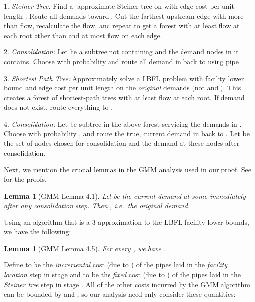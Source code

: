 \documentclass[11pt]{article}
\newtheorem{lem}[thm]{Lemma}
\begin{document}
\begin{description}

\item{1. \emph{Steiner Tree: }}
Find a -approximate Steiner tree on  with edge cost per unit length .  Route all demands toward .  Cut the farthest-upstream edge with more than  flow, recalculate the flow, and repeat to get a forest with at least  flow at each root other than  and at most  flow on each edge.

\item{2. \emph{Consolidation:}}
Let  be a subtree not containing  and  the demand nodes in  it contains.  Choose  with probability  and route all demand in  back to  using pipe .

\item{3. \emph{Shortest Path Tree:}}
Approximately solve a LBFL problem with facility lower bound  and edge cost per unit length  on the \emph{original} demands  (not  and ).  This creates a forest of shortest-path trees with at least  flow at each root.  If  demand does not exist, route everything to .

\item{4. \emph{Consolidation:}}
Let  be subtree in the above forest servicing the demands  in .  Choose  with probability , and route the true, current demand  in  back to .  Let  be the set of nodes chosen for consolidation and  the demand at these nodes after consolidation.
\end{description}

Next, we mention the crucial lemmas in the GMM analysis used in our proof.  See \cite{guha2001cfa} for the proofs.

\begin{lem}[GMM Lemma 4.1] \label{consolidation_lem} 
Let  be the current demand at some  immediately after any consolidation step.  Then , i.e.\ the original demand.
\end{lem}

Using an algorithm that is a 3-approximation to the LBFL facility lower bounds, we have the following:

\begin{lem}[GMM Lemma 4.5] \label{current_demand_lem}
For every , we have .
\end{lem}

Define  to be the \emph{incremental} cost (due to ) of the pipes laid in the \emph{facility location} step in stage  and  to be the \emph{fixed} cost (due to ) of the pipes laid in the \emph{Steiner tree} step in stage .  All of the other costs incurred by the GMM algorithm can be bounded by  and , so our analysis need only consider these quantities:
\end{document}
